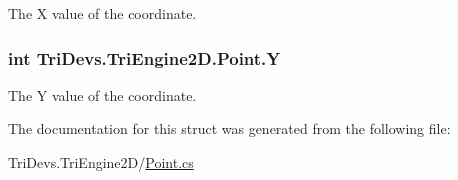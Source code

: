 The X value of the coordinate. 

\hypertarget{struct_tri_devs_1_1_tri_engine2_d_1_1_point_ad750e91b0dbb5a69c3986abba3fbf964}{
\subsubsection[{Y}]{\setlength{\rightskip}{0pt plus 5cm}int Tri\-Devs.\-Tri\-Engine2\-D.\-Point.\-Y}}\label{struct_tri_devs_1_1_tri_engine2_d_1_1_point_ad750e91b0dbb5a69c3986abba3fbf964}


The Y value of the coordinate. 



The documentation for this struct was generated from the following file\-:\begin{DoxyCompactItemize}
\item 
Tri\-Devs.\-Tri\-Engine2\-D/\hyperlink{_point_8cs}{Point.\-cs}\end{DoxyCompactItemize}

